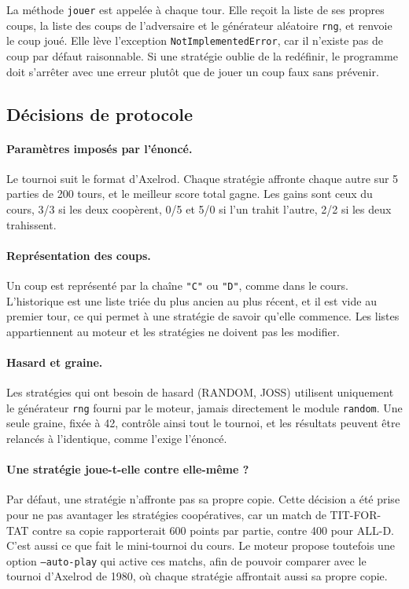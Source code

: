 \documentclass[11pt,a4paper]{article}
\begin{document}
La méthode \texttt{jouer} est appelée à chaque tour. Elle reçoit la liste de ses propres coups, la liste des coups de
l'adversaire et le générateur aléatoire \texttt{rng}, et renvoie le coup joué. Elle lève l'exception
\texttt{NotImplementedError}, car il n'existe pas de coup par défaut raisonnable. Si une stratégie oublie de la redéfinir, le
programme doit s'arrêter avec une erreur plutôt que de jouer un coup faux sans prévenir.

\subsection{Décisions de protocole}
\paragraph{Paramètres imposés par l'énoncé.} Le tournoi suit le format d'Axelrod. Chaque stratégie affronte chaque autre sur
5 parties de 200 tours, et le meilleur score total gagne. Les gains sont ceux du cours, 3/3 si les deux coopèrent, 0/5 et 5/0
si l'un trahit l'autre, 2/2 si les deux trahissent.

\paragraph{Représentation des coups.} Un coup est représenté par la chaîne \texttt{"C"} ou \texttt{"D"}, comme dans le cours.
L'historique est une liste triée du plus ancien au plus récent, et il est vide au premier tour, ce qui permet à une stratégie
de savoir qu'elle commence. Les listes appartiennent au moteur et les stratégies ne doivent pas les modifier.

\paragraph{Hasard et graine.} Les stratégies qui ont besoin de hasard (RANDOM, JOSS) utilisent uniquement le générateur
\texttt{rng} fourni par le moteur, jamais directement le module \texttt{random}. Une seule graine, fixée à 42, contrôle ainsi
tout le tournoi, et les résultats peuvent être relancés à l'identique, comme l'exige l'énoncé.

\paragraph{Une stratégie joue-t-elle contre elle-même ?}
Par défaut, une stratégie n'affronte pas sa propre copie. Cette décision a été prise pour ne pas avantager les stratégies
coopératives, car un match de TIT-FOR-TAT contre sa copie rapporterait 600 points par partie, contre 400 pour ALL-D. C'est aussi
ce que fait le mini-tournoi du cours. Le moteur propose toutefois une option \texttt{--auto-play} qui active ces matchs, afin
de pouvoir comparer avec le tournoi d'Axelrod de 1980, où chaque stratégie affrontait aussi sa propre copie.
\end{document}
